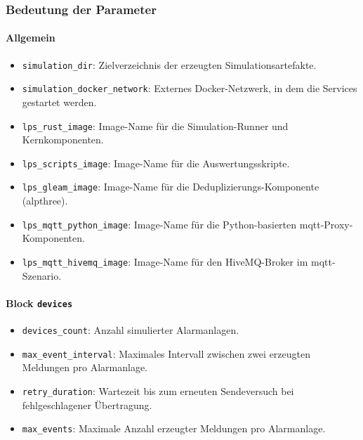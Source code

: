 \subsubsection*{Bedeutung der Parameter}

\paragraph{Allgemein}
\begin{itemize}
    \item \texttt{simulation\_dir}: Zielverzeichnis der erzeugten Simulationsartefakte.
    \item \texttt{simulation\_docker\_network}: Externes Docker-Netzwerk, in dem die Services gestartet werden.
    \item \texttt{lps\_rust\_image}: Image-Name für die Simulation-Runner und Kernkomponenten.
    \item \texttt{lps\_scripts\_image}: Image-Name für die Auswertungsskripte.
    \item \texttt{lps\_gleam\_image}: Image-Name für die Deduplizierungs-Komponente (\gls{alpthree}).
    \item \texttt{lps\_mqtt\_python\_image}: Image-Name für die Python-basierten \gls{mqtt}-Proxy-Komponenten.
    \item \texttt{lps\_mqtt\_hivemq\_image}: Image-Name für den HiveMQ-Broker im \gls{mqtt}-Szenario.
\end{itemize}

\paragraph{Block \texttt{devices}}
\begin{itemize}
    \item \texttt{devices\_count}: Anzahl simulierter Alarmanlagen.
    \item \texttt{max\_event\_interval}: Maximales Intervall zwischen zwei erzeugten Meldungen pro Alarmanlage.
    \item \texttt{retry\_duration}: Wartezeit bis zum erneuten Sendeversuch bei fehlgeschlagener Übertragung.
    \item \texttt{max\_events}: Maximale Anzahl erzeugter Meldungen pro Alarmanlage.
\end{itemize}

